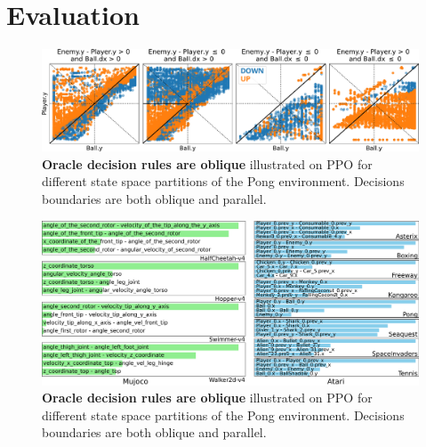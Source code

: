 \chapter{Evaluation}

\begin{figure}[b]
    \centering
    \includegraphics[width=1.\textwidth]{images/images_part3/pong_state_space.pdf}
    \caption{\textbf{Oracle decision rules are oblique} illustrated on PPO for different state space partitions of the Pong environment. Decisions boundaries are both oblique and parallel.}
    \label{fig:pong_states}
\end{figure}


\begin{figure}[b]
    \centering
    \includegraphics[width=1.\textwidth]{images/images_part3/dis_mujoco+f_atari.pdf}
    \caption{\textbf{Oracle decision rules are oblique} illustrated on PPO for different state space partitions of the Pong environment. Decisions boundaries are both oblique and parallel.}
    \label{fig:pong_states}
\end{figure}

